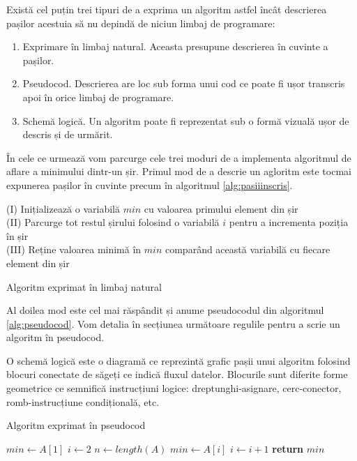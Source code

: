 Există cel puțin trei tipuri de a exprima un algoritm astfel încât descrierea pașilor acestuia să nu depindă de niciun limbaj de programare:
\begin{enumerate}
	\item {Exprimare în limbaj natural. Aceasta presupune descrierea în cuvinte a pașilor.}
	\item {Pseudocod. Descrierea are loc sub forma unui cod ce poate fi ușor transcris apoi în orice limbaj de programare.}
	\item {Schemă logică. Un algoritm poate fi reprezentat sub o formă vizuală ușor de descris și de urmărit.}
\end{enumerate}

În cele ce urmează vom parcurge cele trei moduri de a implementa algoritmul de aflare a minimului dintr-un șir.
Primul mod de a descrie un agloritm este tocmai expunerea pașilor în cuvinte precum în algoritmul \ref{alg:pasiiinscris}.

\begin{algorithm}

	(I) Inițializează o variabilă $min$ cu valoarea primului element din șir\\
	(II) Parcurge tot restul șirului folosind o variabilă $i$ pentru a incrementa poziția în șir\\
	(III) Reține valoarea minimă în $min$ comparând această variabilă cu fiecare element din șir
	\vspace*{0.5cm}
	\caption{Algoritm exprimat în limbaj natural}
	\label{alg:pasiiinscris}
\end{algorithm}

Al doilea mod este cel mai răspândit și anume pseudocodul din algoritmul \ref{alg:pseudocod}. Vom detalia în secțiunea următoare regulile pentru a scrie un algoritm în pseudocod.

O schemă logică este o diagramă ce reprezintă grafic pașii unui algoritm folosind blocuri conectate de săgeți ce indică fluxul datelor.
Blocurile sunt diferite forme geometrice ce semnifică instrucțiuni logice: dreptunghi-asignare, cerc-conector, romb-instrucțiune condițională, etc.

\begin{algorithm}
	\caption{Algoritm exprimat în pseudocod}\label{alg:pseudocod}
	\begin{algorithmic}[1]
		\State $min\gets A[1]$
		\State $i\gets 2$
		\State $n\gets length(A)$
		\State $min \gets A[i]$
		\EndIf
		\State $i\gets i+1$
		\EndWhile\label{pseudocodwhile}
		\State \textbf{return} $min$
		\EndProcedure
	\end{algorithmic}
\end{algorithm}

